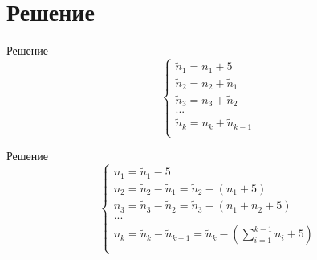 \documentclass[12pt]{beamer}
\begin{document}
\section{Решение}

\begin{frame}{Решение}
\fontsize{15pt}{15pt}\selectfont
    \begin{equation}
        \begin{cases}
            \widetilde{n}_{1} = n_{1} + 5\\
            \widetilde{n}_{2} = n_{2} + \widetilde{n}_{1}\\
            \widetilde{n}_{3} = n_{3} + \widetilde{n}_{2}\\
            ...\\
            \widetilde{n}_{k} = n_{k} + \widetilde{n}_{k-1}\\
        \end{cases}
    \end{equation}
    
    
\end{frame}

\begin{frame}{Решение}
\fontsize{15pt}{15pt}\selectfont
    \begin{equation}
        \begin{cases}
            n_{1} = \widetilde{n}_{1} - 5\\
            n_{2} = \widetilde{n}_{2} - \widetilde{n}_{1} = \widetilde{n}_{2} - (n_{1} + 5)\\
            n_{3} = \widetilde{n}_{3} - \widetilde{n}_{2} = \widetilde{n}_{3} - (n_{1} + n_{2} + 5)\\
            ...\\
            n_{k} = \widetilde{n}_{k} - \widetilde{n}_{k-1} = \widetilde{n}_{k} - (\sum\limits_{i=1}^{k-1} n_{i} + 5)\\
        \end{cases}
    \end{equation}
    
    
\end{frame}
\end{document}

